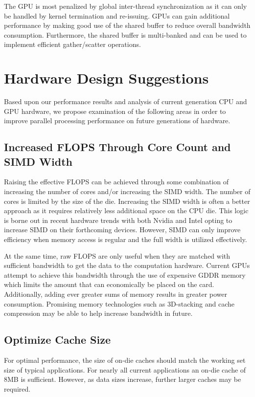 \documentclass[conference]{IEEEtran}
\begin{document}
The GPU is most penalized by global inter-thread synchronization as it can only be handled by kernel termination and re-issuing. GPUs can gain additional performance by making good use of the shared buffer to reduce overall bandwidth consumption. Furthermore, the shared buffer is multi-banked and can be used to implement efficient gather/scatter operations.

\section{Hardware Design Suggestions}

Based upon our performance results and analysis of current generation CPU and GPU hardware, we propose examination of the following areas in order to improve parallel processing performance on future generations of hardware.

\subsection{Increased FLOPS Through Core Count and SIMD Width}

Raising the effective FLOPS can be achieved through some combination of increasing the number of cores and/or increasing the SIMD width. The number of cores is limited by the size of the die. Increasing the SIMD width is often a better approach as it requires relatively less additional space on the CPU die. This logic is borne out in recent hardware trends with both Nvidia and Intel opting to increase SIMD on their forthcoming devices. However, SIMD can only improve efficiency when memory access is regular and the full width is utilized effectively. 

At the same time, raw FLOPS are only useful when they are matched with sufficient bandwidth to get the data to the computation hardware. Current GPUs attempt to achieve this bandwidth through the use of expensive GDDR memory which limits the amount that can economically be placed on the card. Additionally, adding ever greater sums of memory results in greater power consumption. Promising memory technologies such as 3D-stacking and cache compression may be able to help increase bandwidth in future.

\subsection{Optimize Cache Size}

For optimal performance, the size of on-die caches should match the working set size of typical applications. For nearly all current applications an on-die cache of 8MB is sufficient. However, as data sizes increase, further larger caches may be required.
\end{document}
